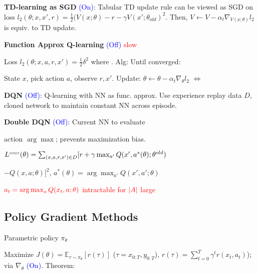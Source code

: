 \vspace*{1mm}
\textbf{TD-learning as SGD} {\fontsize{9}{6}\selectfont \textcolor{blue}{(On)}}: Tabular TD update rule can be viewed as SGD on loss $l_2(\theta; x, x', r) = \frac{1}{2}(V(x;\theta) - r - \gamma V(x'; \theta_{old})^2$. Then, $V \leftarrow V - \alpha_t \nabla_{V(x;\theta)} l_2$ is equiv. to TD update.

\textbf{Function Approx Q-learning} {\fontsize{9}{6}\selectfont \textcolor{blue}{(Off)}} \textcolor{red}{slow}

Loss $l_2(\theta;x,a,r,x') = \frac{1}{2}\delta^2$ where
 . Alg: Until converged:

State $x$, pick action $a$, observe $r,x'$. Update: $\theta \leftarrow \theta - \alpha_t \nabla_\theta l_2$
$\Leftrightarrow$ 

\textbf{DQN} {\fontsize{9}{6}\selectfont \textcolor{blue}{(Off)}}: Q-learning with NN as func. approx. Use experience replay data $D$, cloned network to maintain constant NN across episode.


\textbf{Double DQN} {\fontsize{9}{6}\selectfont \textcolor{blue}{(Off)}}: Current NN to evaluate

action $\arg\max$; prevents maximization bias.

$L^{{\scaleobj{.55}{ DDQN}}} (\theta) = \hspace*{0mm} \sum_{(x,a,r,x') \in D} \hspace*{0mm} [r + \gamma \max_{a'} Q(x', a^*(\theta); \theta^{old})$

$ - Q(x,a;\theta) ]^2$,
$a^*(\theta) = \arg\max_{a'} Q(x', a'; \theta)$

\textcolor{red}{$\textcolor{red}{a_t = \arg\max_a Q(x_t,a;\theta)}$ intractable for $\textcolor{red}{|A|}$ large}

\subsection*{Policy Gradient Methods} Parametric policy $\pi_\theta$

Maximize $J(\theta) = \mathbb{E}_{\tau \sim \pi_\theta} [r(\tau)]$ ($\tau = x_{0:T}, y_{0:T}$), $r(\tau) = \sum_{t=0}^{T} \gamma^t r(x_t, a_t)$); via $\nabla_\theta$ {\fontsize{9}{6}\selectfont \textcolor{blue}{(On)}}. Theorem:

